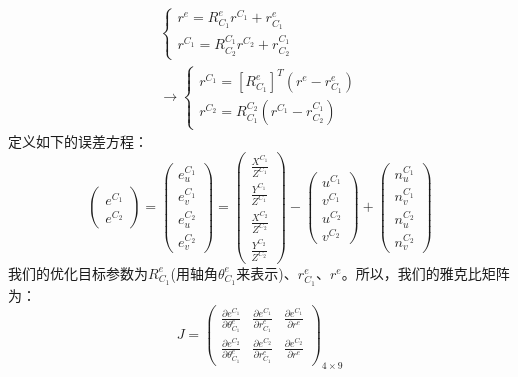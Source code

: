\documentclass[12pt, twocolumn]{article}
\begin{document}
\begin{equation*}
	\begin{aligned}
			\begin{cases}
			r^{e}=R_{C_1}^{e}r^{C_1}+r_{C_1}^e\\		r^{C_1}=R_{C_2}^{C_1}r^{C_2}+r_{C_2}^{C_1}	\end{cases}\\
		\to\begin{cases}
			r^{C_1}=[R_{C_1}^e]^T(r^e-r_{C_1}^e)\\	
			r^{C_2}=R_{C_1}^{C_2}(r^{C_1}-r^{C_1}_{C_2})	\end{cases}
	\end{aligned}
\end{equation*}
	定义如下的误差方程：
	\begin{equation*}
		\begin{pmatrix}
			e^{C_1}\\e^{C_2}
		\end{pmatrix}=
		\begin{pmatrix}
			e^{C_1}_u\\e^{C_1}_v\\e^{C_2}_u\\e^{C_2}_v
		\end{pmatrix}=\begin{pmatrix}
		\frac{X^{C_1}}{Z^{C_1}}\\\frac{Y^{C_1}}{Z^{C_1}}
		\\\frac{X^{C_2}}{Z^{C_2}}\\\frac{Y^{C_2}}{Z^{C_2}}
	\end{pmatrix}-
		\begin{pmatrix}
			u^{C_1}\\v^{C_1}\\u^{C_2}\\v^{C_2}
		\end{pmatrix}+	\begin{pmatrix}
		n^{C_1}_u\\n^{C_1}_v\\n^{C_2}_u\\n^{C_2}_v
	\end{pmatrix}
	\end{equation*}
	我们的优化目标参数为$R_{C_1}^e$(用轴角$\theta_{C_1}^e$来表示)、$r_{C_1}^e$、$r^{e}$。所以，我们的雅克比矩阵为：
	\begin{equation*}
		J=\begin{pmatrix}
			\frac{\partial e^{C_1}}{\partial\theta_{C_1}^e}&
			\frac{\partial e^{C_1}}{\partial r_{C_1}^e}&
			\frac{\partial e^{C_1}}{\partial r^{e}}\\
			\frac{\partial e^{C_2}}{\partial\theta_{C_1}^e}&
			\frac{\partial e^{C_2}}{\partial r_{C_1}^e}&
			\frac{\partial e^{C_2}}{\partial r^{e}}
		\end{pmatrix}_{4\times 9}
	\end{equation*}
\end{document}
